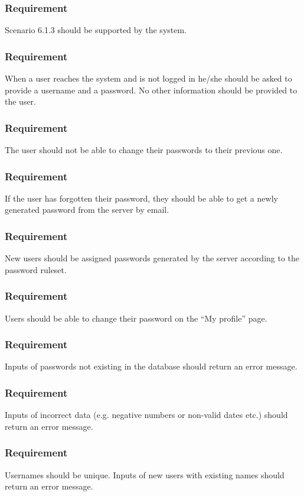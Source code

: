 \documentclass{article}
\begin{document}
\subsubsection{Requirement}
Scenario 6.1.3 should be supported by the system.

\subsubsection{Requirement}
 When  a  user  reaches  the  system  and  is  not  logged  in he/she should be asked to provide a username and a password.  No other information should be provided to the user.

\subsubsection{Requirement}
The user should not be able to change their passwords to their previous one.

\subsubsection{Requirement}
If the user has forgotten their password, they should be able to get a newly generated password from the server by email.

\subsubsection{Requirement}
New users should be assigned passwords generated by the server according to the password ruleset.

\subsubsection{Requirement}
Users should be able to change their password on the “My profile” page.
\subsubsection{Requirement}
Inputs of passwords not existing in the database should return an error message.
\subsubsection{Requirement }
Inputs of incorrect data (e.g. negative numbers or non-valid dates etc.) should return an error message.
\subsubsection{Requirement }
Usernames should be unique. Inputs of new users with existing names should return an error message.
\end{document}
